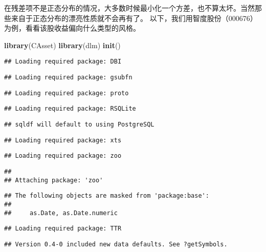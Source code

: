 \documentclass[]{ctexart}
\newenvironment{Shaded}{\begin{snugshade}}{\end{snugshade}}
\newcommand{\KeywordTok}[1]{\textcolor[rgb]{0.13,0.29,0.53}{\textbf{{#1}}}}
\newcommand{\NormalTok}[1]{{#1}}
\begin{document}
在残差项不是正态分布的情况，大多数时候最小化一个方差，也不算太坏。当然那些来自于正态分布的漂亮性质就不会再有了。
以下，我们用智度股份（000676）为例，看看该股收益偏向什么类型的风格。

\begin{Shaded}
\begin{Highlighting}[]
\KeywordTok{library}\NormalTok{(CAsset)}
\KeywordTok{library}\NormalTok{(dlm)}
\KeywordTok{init}\NormalTok{()}
\end{Highlighting}
\end{Shaded}

\begin{verbatim}
## Loading required package: DBI
\end{verbatim}

\begin{verbatim}
## Loading required package: gsubfn
\end{verbatim}

\begin{verbatim}
## Loading required package: proto
\end{verbatim}

\begin{verbatim}
## Loading required package: RSQLite
\end{verbatim}

\begin{verbatim}
## sqldf will default to using PostgreSQL
\end{verbatim}

\begin{verbatim}
## Loading required package: xts
\end{verbatim}

\begin{verbatim}
## Loading required package: zoo
\end{verbatim}

\begin{verbatim}
## 
## Attaching package: 'zoo'
\end{verbatim}

\begin{verbatim}
## The following objects are masked from 'package:base':
## 
##     as.Date, as.Date.numeric
\end{verbatim}

\begin{verbatim}
## Loading required package: TTR
\end{verbatim}

\begin{verbatim}
## Version 0.4-0 included new data defaults. See ?getSymbols.
\end{verbatim}
\end{document}
